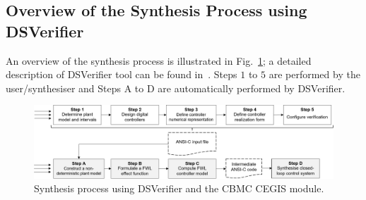 \documentclass{sig-alternate-05-2015}
\newcommand{\red}[1]{{\color{red}#1}}
\begin{document}






\subsection{Overview of the Synthesis Process using DSVerifier}
\label{verification-flow}


An overview of the synthesis process is illustrated in Fig.~\ref{DSVerifier_process};
a detailed description of DSVerifier tool can be found in~\cite{IsmailBCFF15}.
Steps $1$ to $5$ are performed by the user/synthesiser and
Steps A to D are automatically performed by DSVerifier.

\begin{figure}[t]
\centering
\includegraphics[width=\textwidth]{figures/verification-flow.png}
\vspace{1ex}
\caption{Synthesis process using DSVerifier and the CBMC CEGIS module.}
\label{DSVerifier_process}
\end{figure}
\end{document}

